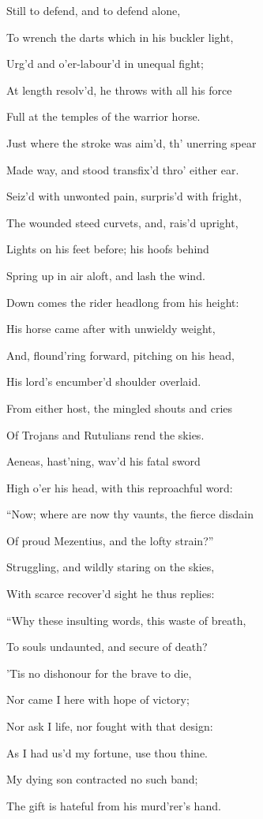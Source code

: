 Still to defend, and to defend alone,

To wrench the darts which in his buckler light,

Urg’d and o’er-labour’d in unequal fight;

At length resolv’d, he throws with all his force

Full at the temples of the warrior horse.

Just where the stroke was aim’d, th’ unerring spear

Made way, and stood transfix’d thro’ either ear.

Seiz’d with unwonted pain, surpris’d with fright,

The wounded steed curvets, and, rais’d upright,

Lights on his feet before; his hoofs behind

Spring up in air aloft, and lash the wind.

Down comes the rider headlong from his height:

His horse came after with unwieldy weight,

And, flound’ring forward, pitching on his head,

His lord’s encumber’d shoulder overlaid.

From either host, the mingled shouts and cries

Of Trojans and Rutulians rend the skies.

Aeneas, hast’ning, wav’d his fatal sword

High o’er his head, with this reproachful word:

“Now; where are now thy vaunts, the fierce disdain

Of proud Mezentius, and the lofty strain?”

Struggling, and wildly staring on the skies,

With scarce recover’d sight he thus replies:

“Why these insulting words, this waste of breath,

To souls undaunted, and secure of death?

’Tis no dishonour for the brave to die,

Nor came I here with hope of victory;

Nor ask I life, nor fought with that design:

As I had us’d my fortune, use thou thine.

My dying son contracted no such band;

The gift is hateful from his murd’rer’s hand.

